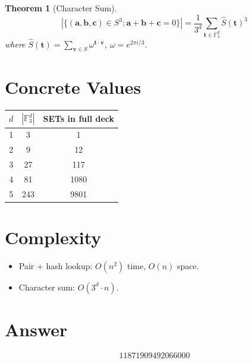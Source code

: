 \documentclass[11pt]{article}
\newtheorem{theorem}{Theorem}
\begin{document}
\begin{theorem}[Character Sum]
\[
|\{(\mathbf{a},\mathbf{b},\mathbf{c}) \in S^3 : \mathbf{a}+\mathbf{b}+\mathbf{c} = 0\}| = \frac{1}{3^d}\sum_{\mathbf{t} \in \mathbb{F}_3^d} \hat{S}(\mathbf{t})^3
\]
where $\hat{S}(\mathbf{t}) = \sum_{\mathbf{v} \in S} \omega^{\mathbf{t}\cdot\mathbf{v}}$, $\omega = e^{2\pi i/3}$.
\end{theorem}

\section{Concrete Values}

\begin{center}
\begin{tabular}{ccc}
\toprule
$d$ & $|\mathbb{F}_3^d|$ & SETs in full deck \\
\midrule
1 & 3 & 1 \\
2 & 9 & 12 \\
3 & 27 & 117 \\
4 & 81 & 1080 \\
5 & 243 & 9801 \\
\bottomrule
\end{tabular}
\end{center}

\section{Complexity}

\begin{itemize}
\item Pair + hash lookup: $O(n^2)$ time, $O(n)$ space.
\item Character sum: $O(3^d \cdot n)$.
\end{itemize}

\section{Answer}

\[
\boxed{11871909492066000}
\]
\end{document}
